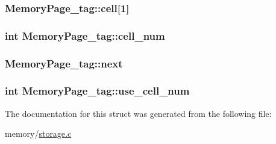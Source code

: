 \subsubsection[{cell}]{ Memory\+Page\+\_\+tag\+::cell\mbox{[}1\mbox{]}}\label{struct_memory_page__tag_a7f1abbe528efa4a8fdea13cfc2757b8a}
\hypertarget{struct_memory_page__tag_a683e8a1f905f2e4203bc9609c75e4e4c}{}
\subsubsection[{cell\+\_\+num}]{\setlength{\rightskip}{0pt plus 5cm}int Memory\+Page\+\_\+tag\+::cell\+\_\+num}\label{struct_memory_page__tag_a683e8a1f905f2e4203bc9609c75e4e4c}
\hypertarget{struct_memory_page__tag_a53d3c92ac52441fba678eda169980229}{}
\subsubsection[{next}]{ Memory\+Page\+\_\+tag\+::next}\label{struct_memory_page__tag_a53d3c92ac52441fba678eda169980229}
\hypertarget{struct_memory_page__tag_a21416c5c747f6617e9ecf641f086c614}{}
\subsubsection[{use\+\_\+cell\+\_\+num}]{\setlength{\rightskip}{0pt plus 5cm}int Memory\+Page\+\_\+tag\+::use\+\_\+cell\+\_\+num}\label{struct_memory_page__tag_a21416c5c747f6617e9ecf641f086c614}


The documentation for this struct was generated from the following file\+:\begin{DoxyCompactItemize}
\item 
memory/\hyperlink{storage_8c}{storage.\+c}\end{DoxyCompactItemize}
